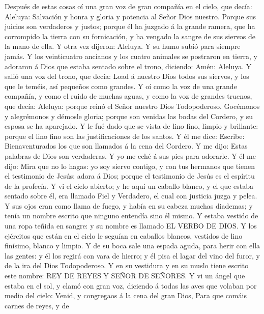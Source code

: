  Después de estas cosas oí una gran voz de gran compañía en
el cielo, que decía: Aleluya: Salvación y honra y gloria y potencia al
Señor Dios nuestro.  Porque sus juicios son verdaderos y
justos; porque él ha juzgado á la grande ramera, que ha corrompido la
tierra con su fornicación, y ha vengado la sangre de sus siervos de la
mano de ella.  Y otra vez dijeron: Aleluya. Y su humo subió
para siempre jamás.  Y los veinticuatro ancianos y los
cuatro animales se postraron en tierra, y adoraron á Dios que estaba
sentado sobre el trono, diciendo: Amén: Aleluya.  Y salió
una voz del trono, que decía: Load á nuestro Dios todos sus siervos, y
los que le teméis, así pequeños como grandes.  Y oí como la
voz de una grande compañía, y como el ruido de muchas aguas, y como la
voz de grandes truenos, que decía: Aleluya: porque reinó el Señor
nuestro Dios Todopoderoso.  Gocémonos y alegrémonos y
démosle gloria; porque son venidas las bodas del Cordero, y su esposa se
ha aparejado.  Y le fué dado que se vista de lino fino,
limpio y brillante: porque el lino fino son las justificaciones de los
santos.  Y él me dice: Escribe: Bienaventurados los que son
llamados á la cena del Cordero. Y me dijo: Estas palabras de Dios son
verdaderas.  Y yo me eché á sus pies para adorarle. Y él me
dijo: Mira que no lo hagas: yo soy siervo contigo, y con tus hermanos
que tienen el testimonio de Jesús: adora á Dios; porque el testimonio de
Jesús es el espíritu de la profecía.  Y vi el cielo
abierto; y he aquí un caballo blanco, y el que estaba sentado sobre él,
era llamado Fiel y Verdadero, el cual con justicia juzga y pelea.
 Y sus ojos eran como llama de fuego, y había en su cabeza
muchas diademas; y tenía un nombre escrito que ninguno entendía sino él
mismo.  Y estaba vestido de una ropa teñida en sangre: y su
nombre es llamado EL VERBO DE DIOS.  Y los ejércitos que
están en el cielo le seguían en caballos blancos, vestidos de lino
finísimo, blanco y limpio.  Y de su boca sale una espada
aguda, para herir con ella las gentes: y él los regirá con vara de
hierro; y él pisa el lagar del vino del furor, y de la ira del Dios
Todopoderoso.  Y en su vestidura y en su muslo tiene
escrito este nombre: REY DE REYES Y SEÑOR DE SEÑORES.  Y vi
un ángel que estaba en el sol, y clamó con gran voz, diciendo á todas
las aves que volaban por medio del cielo: Venid, y congregaos á la cena
del gran Dios,  Para que comáis carnes de reyes, y de
